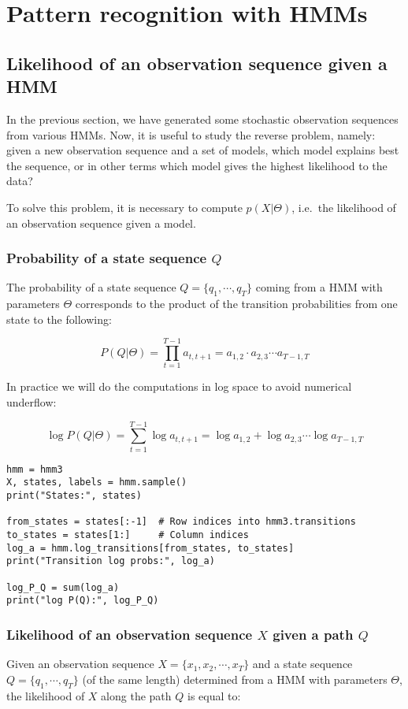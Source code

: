\documentclass[11pt]{article}
\begin{document}
\section{Pattern recognition with HMMs}
\label{sec:org4e2e819}
\subsection{Likelihood of an observation sequence given a HMM}
\label{sec:orgf328a11}
In the previous section, we have generated some stochastic observation sequences
from various HMMs. Now, it is useful to study the reverse problem,
namely: given a new observation sequence and a set of models, which
model explains best the sequence, or in other terms which model gives
the highest likelihood to the data?

To solve this problem, it is necessary to compute \(p(X|\Theta)\),
i.e. the likelihood of an observation sequence given a model.

\subsubsection{Probability of a state sequence \(Q\)}
\label{sec:org7873f34}
The probability of a state sequence \(Q=\{q_1,\cdots,q_T\}\) coming from a
HMM with parameters \(\Theta\) corresponds to the product of the
transition probabilities from one state to the following:

$$
P(Q|\Theta) = \prod_{t=1}^{T-1} a_{t,t+1}
= a_{1,2} \cdot a_{2,3} \cdots a_{T-1,T}
$$

\noindent
In practice we will do the computations in log space to avoid numerical
underflow:

$$
\log P(Q|\Theta) = \sum_{t=1}^{T-1} \log a_{t,t+1}
= \log a_{1,2} + \log a_{2,3} \cdots \log a_{T-1,T}
$$

\begin{verbatim}
hmm = hmm3
X, states, labels = hmm.sample()
print("States:", states)

from_states = states[:-1]  # Row indices into hmm3.transitions
to_states = states[1:]     # Column indices
log_a = hmm.log_transitions[from_states, to_states]
print("Transition log probs:", log_a)

log_P_Q = sum(log_a)
print("log P(Q):", log_P_Q)
\end{verbatim}

\subsubsection{Likelihood of an observation sequence \(X\) given a path \(Q\)}
\label{sec:orgde9321f}
Given an observation sequence \(X=\{x_1,x_2,\cdots,x_T\}\) and a state
sequence \(Q=\{q_1,\cdots,q_T\}\) (of the same length) determined from a
HMM with parameters \(\Theta\), the likelihood of \(X\) along the path \(Q\)
is equal to:
\end{document}

